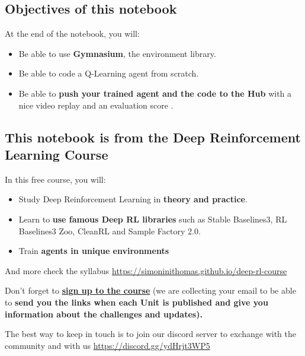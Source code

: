 \documentclass[11pt,a4paper]{article}
\begin{document}
\subsection{Objectives of this notebook}\label{objectives-of-this-notebook}

At the end of the notebook, you will:

\begin{itemize}
\tightlist
\item
  Be able to use \textbf{Gymnasium}, the environment library.
\item
  Be able to code a Q-Learning agent from scratch.
\item
  Be able to \textbf{push your trained agent and the code to the Hub} with a nice video replay and an evaluation score .
\end{itemize}

\subsection{This notebook is from the Deep Reinforcement Learning Course}\label{this-notebook-is-from-the-deep-reinforcement-learning-course}


In this free course, you will:

\begin{itemize}
\tightlist
\item
  Study Deep Reinforcement Learning in \textbf{theory and practice}.
\item
  Learn to \textbf{use famous Deep RL libraries} such as Stable Baselines3, RL Baselines3 Zoo, CleanRL and Sample Factory 2.0.
\item
  Train \textbf{agents in unique environments}
\end{itemize}

And more check the syllabus \url{https://simoninithomas.github.io/deep-rl-course}

Don't forget to \textbf{\href{http://eepurl.com/ic5ZUD}{sign up to the course}} (we are collecting your email to be able to \textbf{send you the links when each Unit is published and give you information about the challenges and updates).}

The best way to keep in touch is to join our discord server to exchange with the community and with us \url{https://discord.gg/ydHrjt3WP5}
\end{document}
